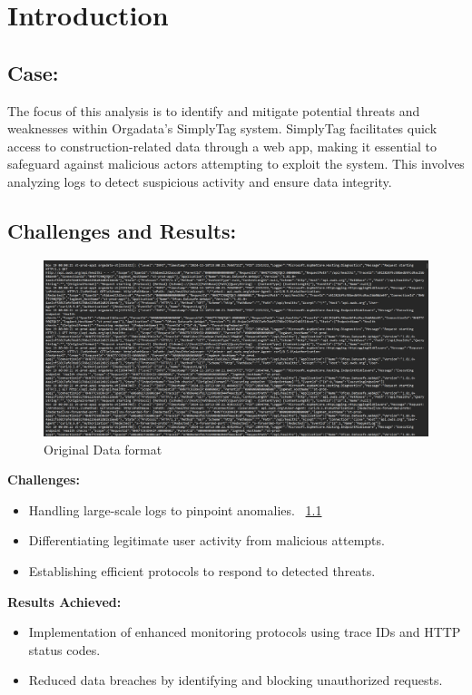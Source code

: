 %
%

\chapter{Introduction}

\section{Case:}

The focus of this analysis is to identify and mitigate potential threats and weaknesses within Orgadata’s SimplyTag system. SimplyTag facilitates quick access to construction-related data through a web app, making it essential to safeguard against malicious actors attempting to exploit the system. This involves analyzing logs to detect suspicious activity and ensure data integrity.

\section{Challenges and Results:}

\begin{figure}
	\begin{center}
		\includegraphics[width=0.7\linewidth]{Images/Data_Img.png}
		\caption{Original Data format}
		\label{Data_Img} 
	\end{center}
\end{figure}

\textbf{Challenges:}
\begin{itemize}
	\item Handling large-scale logs to pinpoint anomalies. ~\ref{Data_Img}
	\item Differentiating legitimate user activity from malicious attempts.
	\item Establishing efficient protocols to respond to detected threats.
\end{itemize}

\textbf{Results Achieved:}
\begin{itemize}
	\item Implementation of enhanced monitoring protocols using trace IDs and HTTP status codes.
	\item Reduced data breaches by identifying and blocking unauthorized requests.
\end{itemize}



